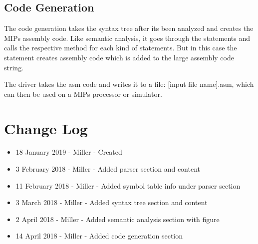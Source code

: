 \documentclass[english]{article}
\begin{document}
\subsection{Code Generation}

The code generation takes the syntax tree after its been analyzed and creates the MIPs assembly code. Like semantic analysis, it goes through the statements and calls the respective method for each kind of statements. But in this case the statement creates assembly code which is added to the large assembly code string.

The driver takes the asm code and writes it to a file: [input file name].asm, which can then be used on a MIPs processor or simulator.


\par\addvspace{1cm}%
\section{Change Log}

\begin{itemize}
\item
18 January 2019 - Miller - Created
\item
3 February  2018 - Miller - Added parser section and content
\item
11 February 2018 - Miller - Added symbol table info under parser section
\item
3 March 2018 - Miller - Added syntax tree section and content
\item
2 April 2018 - Miller - Added semantic analysis section with figure
\item
14 April 2018 - Miller - Added code generation section

\end{itemize}
\end{document}
